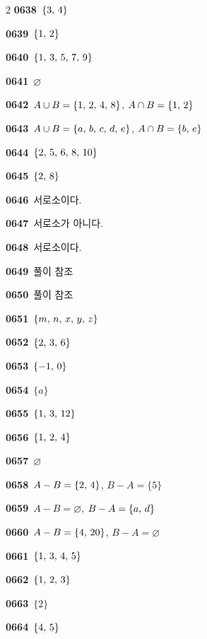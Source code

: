 \documentclass[10pt,a4paper]{article}
\begin{document}
\begin{multicols}{2}
\noindent\textbf{0638}\ $\{3,\mkern3mu 4\}$\par
\noindent\textbf{0639}\ $\{1,\mkern3mu 2\}$\par
\noindent\textbf{0640}\ $\{1,\mkern3mu 3,\mkern3mu 5,\mkern3mu 7,\mkern3mu 9\}$\par
\noindent\textbf{0641}\ $\varnothing$\par
\noindent\textbf{0642}\ $A\cup B=\{1,\mkern3mu 2,\mkern3mu 4,\mkern3mu 8\}$, $A\cap B=\{1,\mkern3mu 2\}$\par
\noindent\textbf{0643}\ $A\cup B=\{a,\mkern3mu b,\mkern3mu c,\mkern3mu d,\mkern3mu e\}$, $A\cap B=\{b,\mkern3mu e\}$\par
\noindent\textbf{0644}\ $\{2,\mkern3mu 5,\mkern3mu 6,\mkern3mu 8,\mkern3mu 10\}$\par
\noindent\textbf{0645}\ $\{2,\mkern3mu 8\}$\par
\noindent\textbf{0646}\ 서로소이다.\par
\noindent\textbf{0647}\ 서로소가 아니다.\par
\noindent\textbf{0648}\ 서로소이다.\par
\noindent\textbf{0649}\ 풀이 참조\par
\noindent\textbf{0650}\ 풀이 참조\par
\noindent\textbf{0651}\ $\{m,\mkern3mu n,\mkern3mu x,\mkern3mu y,\mkern3mu z\}$\par
\noindent\textbf{0652}\ $\{2,\mkern3mu 3,\mkern3mu 6\}$\par
\noindent\textbf{0653}\ $\{-1,\mkern3mu 0\}$\par
\noindent\textbf{0654}\ $\{a\}$\par
\noindent\textbf{0655}\ $\{1,\mkern3mu 3,\mkern3mu 12\}$\par
\noindent\textbf{0656}\ $\{1,\mkern3mu 2,\mkern3mu 4\}$\par
\noindent\textbf{0657}\ $\varnothing$\par
\noindent\textbf{0658}\ $A-B=\{2,\mkern3mu 4\}$, $B-A=\{5\}$\par
\noindent\textbf{0659}\ $A-B=\varnothing$, $B-A=\{a,\mkern3mu d\}$\par
\noindent\textbf{0660}\ $A-B=\{4,\mkern3mu 20\}$, $B-A=\varnothing$\par
\noindent\textbf{0661}\ $\{1,\mkern3mu 3,\mkern3mu 4,\mkern3mu 5\}$\par
\noindent\textbf{0662}\ $\{1,\mkern3mu 2,\mkern3mu 3\}$\par
\noindent\textbf{0663}\ $\{2\}$\par
\noindent\textbf{0664}\ $\{4,\mkern3mu 5\}$\par

\end{multicols}
\end{document}
